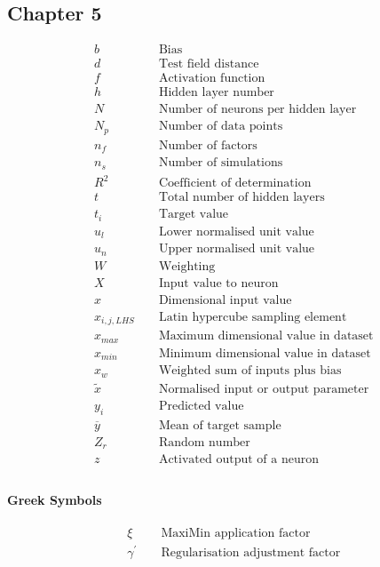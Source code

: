 \subsection*{Chapter 5}
\begin{align*}
	&b && \text { Bias } \\
	&d && \text { Test field distance } \\
	&f && \text { Activation function } \\
	&h && \text { Hidden layer number } \\
	&N && \text { Number of neurons per hidden layer } \\
	&N_p && \text { Number of data points } \\
	&n_f && \text { Number of factors } \\
	&n_s && \text { Number of simulations } \\
	&R^2 && \text { Coefficient of determination } \\
	&t && \text { Total number of hidden layers } \\
	&t_i && \text { Target value } \\
	&u_l && \text { Lower normalised unit value } \\
	&u_n && \text { Upper normalised unit value } \\
	&W && \text { Weighting } \\
	&X && \text { Input value to neuron } \\
	&x && \text { Dimensional input value } \\
	&x_{i,j,LHS} && \text { Latin hypercube sampling element } \\
	&x_{max} && \text { Maximum dimensional value in dataset } \\
	&x_{min} && \text { Minimum dimensional value in dataset } \\
	&x_w && \text { Weighted sum of inputs plus bias } \\
	&\tilde{x} && \text { Normalised input or output parameter } \\
	&y_i && \text { Predicted value } \\
	&\overline{y} && \text { Mean of target sample } \\
	&Z_r && \text { Random number } \\
	&z && \text { Activated output of a neuron } \\
\end{align*}

\paragraph{Greek Symbols}
\begin{align*}
	&\xi && \text { MaxiMin application factor } \\
	&\gamma^{\prime} && \text { Regularisation adjustment factor } \\
\end{align*}


